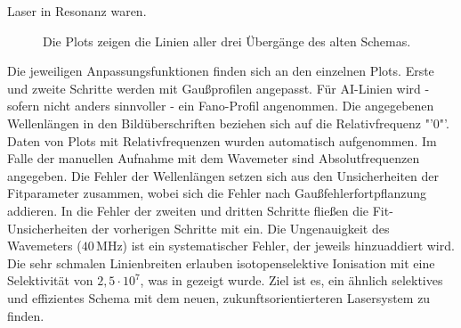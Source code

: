 Laser in Resonanz waren.
\begin{figure}[hp]
 	\centering
 	\footnotesize
	\caption[Anregungsschritte, altes System]{Die
	Plots zeigen die Linien aller drei Übergänge des alten Schemas.}
	\label{fig:linienscans_altes_schema}
\end{figure}
Die jeweiligen Anpassungsfunktionen finden sich an den einzelnen Plots. Erste
und zweite Schritte werden mit Gaußprofilen angepasst. Für
AI-Linien wird - sofern nicht anders sinnvoller - ein Fano-Profil angenommen.
Die angegebenen Wellenlängen in den Bildüberschriften beziehen sich auf die
Relativfrequenz "'$0$"'. Daten von
Plots mit Relativfrequenzen wurden automatisch aufgenommen. Im Falle der
manuellen Aufnahme mit dem Wavemeter sind Absolutfrequenzen angegeben. Die
Fehler der Wellenlängen setzen sich aus den Unsicherheiten der Fitparameter
zusammen, wobei sich die Fehler nach Gaußfehlerfortpflanzung addieren. In die
Fehler der zweiten und dritten Schritte fließen die Fit-Unsicherheiten der
vorherigen Schritte mit ein. Die Ungenauigkeit
des Wavemeters ($40\,$MHz) ist ein systematischer Fehler, der jeweils
hinzuaddiert wird.
Die sehr schmalen Linienbreiten erlauben isotopenselektive Ionisation mit eine Selektivität von
$2,5\cdot10^7$, was in \cite{raeder:2011:dissertation} gezeigt wurde. Ziel ist
es, ein ähnlich selektives und effizientes Schema mit dem neuen,
zukunftsorientierteren Lasersystem zu finden.

